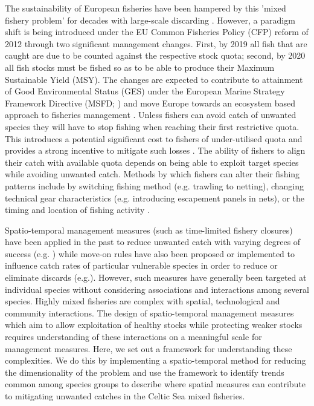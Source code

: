 \documentclass{nature}
\begin{document}
\begin{linenumbers}
The sustainability of European fisheries have been hampered by this 'mixed
fishery problem' for decades with large-scale discarding \cite{Borges2015,
	Uhlmann2014}.  However, a paradigm shift is being introduced under the
EU Common Fisheries Policy (CFP) reform of 2012 through two significant
management changes.  First, by 2019 all fish that are caught are due to be
counted against the respective stock quota; second, by 2020 all fish stocks
must be fished so as to be able to produce their Maximum Sustainable Yield
(MSY)\cite{EuropeanParliamentandCounciloftheEuropeanUnion2013}. The changes are
expected to contribute to attainment of Good Environmental Status (GES) under
the European Marine Strategy Framework Directive (MSFD;
\cite{EuropeanParliament2008}) and move Europe towards an ecosystem based
approach to fisheries management \cite{Garcia2003}. Unless fishers can avoid
catch of unwanted species they will have to stop fishing when reaching their
first restrictive quota. This introduces a potential significant cost to
fishers of under-utilised quota\cite{Hoff2010a, Ulrich2016} and provides a
strong incentive to mitigate such losses \cite{Condie2013, Condie2013a}. The
ability of fishers to align their catch with available quota depends on being
able to exploit target species while avoiding unwanted catch. Methods by which
fishers can alter their fishing patterns include by switching fishing method
(e.g. trawling to netting), changing technical gear characteristics (e.g.
introducing escapement panels in nets), or the timing and location of fishing
activity \cite{Fulton2011b, vanPutten2012a}.

Spatio-temporal management measures (such as time-limited fishery closures)
have been applied in the past to reduce unwanted catch with varying degrees of
success (e.g. \cite{Needle2011, Holmes2011, Beare2010, Dinmore2003}) while
move-on rules have also been proposed or implemented to influence catch rates
of particular vulnerable species in order to reduce or eliminate discards
(e.g.\cite{Gardner2008, Dunn2011, Dunn2014a}). However, such measures have
generally been targeted at individual species without considering associations
and interactions among several species. Highly mixed fisheries are complex with
spatial, technological and community interactions. The design of
spatio-temporal management measures which aim to allow exploitation of healthy
stocks while protecting weaker stocks requires understanding of these
interactions on a meaningful scale for management measures. Here, we set out a
framework for understanding these complexities. We do this by implementing a
spatio-temporal method for reducing the dimensionality of the problem and use
the framework to identify trends common among species groups to describe where
spatial measures can contribute to mitigating unwanted catches in the Celtic
Sea mixed fisheries.
 


\end{linenumbers}
\end{document}
